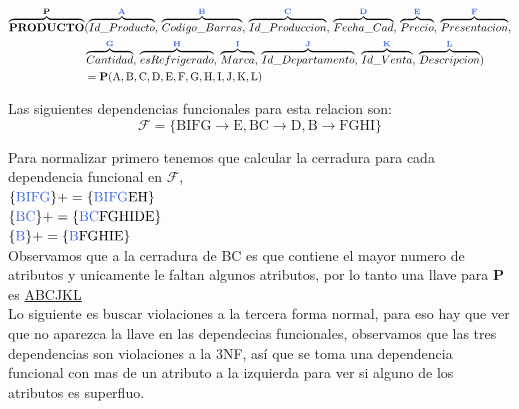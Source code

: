 \documentclass[10pt]{article}
\begin{document}
\begin{align*}
\overbrace{ \textbf{PRODUCTO}}^{\textbf{{P}}}&(\overbrace{ Id\_Producto}^{\textbf{\textcolor{RoyalBlue}{A}}},\,\overbrace{Codigo\_Barras}^{\textbf{\textcolor{RoyalBlue}{B}}},\,\overbrace{Id\_Produccion}^{\textbf{\textcolor{RoyalBlue}{C}}},\,\overbrace{Fecha\_Cad}^{\textbf{\textcolor{RoyalBlue}{D}}},\,\overbrace{Precio}^{\textbf{\textcolor{RoyalBlue}{E}}},\,\overbrace{Presentacion}^{\textbf{\textcolor{RoyalBlue}{F}}},\\&\overbrace{Cantidad}^{\textbf{\textcolor{RoyalBlue}{G}}},\,\overbrace{esRefrigerado}^{\textbf{\textcolor{RoyalBlue}{H}}},\,\overbrace{Marca}^{\textbf{\textcolor{RoyalBlue}{I}}},\,\overbrace{Id\_Departamento}^{\textbf{\textcolor{RoyalBlue}{J}}},\,\overbrace{Id\_Venta}^{\textbf{\textcolor{RoyalBlue}{K}}},\,\overbrace{Descripcion}^{\textbf{\textcolor{RoyalBlue}{L}}})\\
&= \textbf{P}(\mathrm{A,B,C,D,E,F,G,H,I,J,K,L})
\end{align*}

Las siguientes dependencias funcionales para esta relacion son:\\

$$\mathcal{F}=\mathrm{\{ BIFG \rightarrow E, BC \rightarrow D, B \rightarrow FGHI \}}$$

Para normalizar primero tenemos que calcular la cerradura para cada dependencia funcional en $\mathcal{F}$,\\


$\mathrm{\{\textcolor{RoyalBlue}{BIFG}\}+= \{\textcolor{RoyalBlue}{BIFG}EH\}}$\\

$\mathrm{\{\textcolor{RoyalBlue}{BC}\}+= \{\textcolor{RoyalBlue}{BC}FGHIDE\}}$\\

$\mathrm{\{\textcolor{RoyalBlue}{B}\}+= \{\textcolor{RoyalBlue}{B}FGHIE\}}$\\


Observamos que a la cerradura de BC es que contiene el mayor numero de atributos y unicamente le faltan algunos atributos, por lo tanto una llave para \textbf{P} es \underline{ABCJKL} \\

Lo siguiente es buscar violaciones a la tercera forma normal, para eso hay que ver que no aparezca la llave en las dependecias funcionales, observamos que las tres dependencias son violaciones a la 3NF, así que se toma una dependencia funcional con mas de un atributo a la izquierda para ver si alguno de los atributos es superfluo.\\
\end{document}
